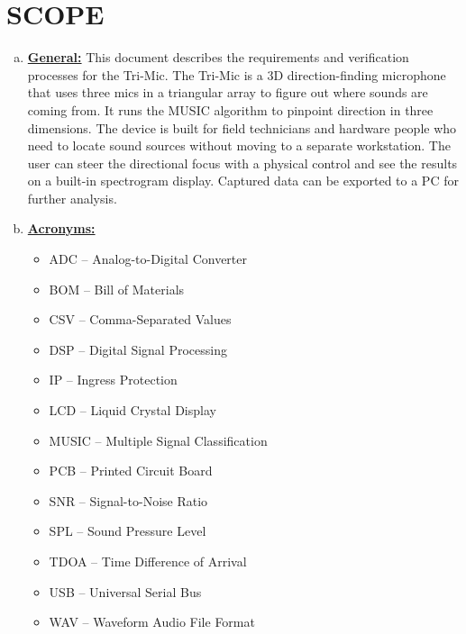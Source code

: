 \section{SCOPE}

\begin{enumerate}[(a)]
	\item \textbf{\underline{General:}} This document describes the requirements and verification processes for the Tri-Mic.  The Tri-Mic is a 3D direction-finding microphone that uses three mics in a triangular array to figure out where sounds are coming from.  It runs the MUSIC algorithm to pinpoint direction in three dimensions.  The device is built for field technicians and hardware people who need to locate sound sources without moving to a separate workstation.  The user can steer the directional focus with a physical control and see the results on a built-in spectrogram display.  Captured data can be exported to a PC for further analysis.

	\item \textbf{\underline{Acronyms:}}
	\begin{itemize}
		\item ADC -- Analog-to-Digital Converter
		\item BOM -- Bill of Materials
		\item CSV -- Comma-Separated Values
		\item DSP -- Digital Signal Processing
		\item IP -- Ingress Protection
		\item LCD -- Liquid Crystal Display
		\item MUSIC -- Multiple Signal Classification
		\item PCB -- Printed Circuit Board
		\item SNR -- Signal-to-Noise Ratio
		\item SPL -- Sound Pressure Level
		\item TDOA -- Time Difference of Arrival
		\item USB -- Universal Serial Bus
		\item WAV -- Waveform Audio File Format
	\end{itemize}
\end{enumerate}
